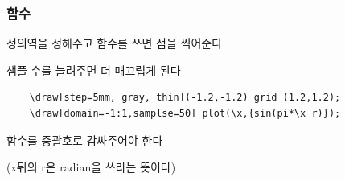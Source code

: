 \documentclass[12pt]{beamer}
\begin{document}
\subsubsection{함수}
\begin{frame}[fragile]{\secname}{\subsecname}
	정의역을 정해주고 함수를 쓰면 점을 찍어준다
	
	샘플 수를 늘려주면 더 매끄럽게 된다
	\begin{lstlisting}
	\draw[step=5mm, gray, thin](-1.2,-1.2) grid (1.2,1.2);
	\draw[domain=-1:1,samplse=50] plot(\x,{sin(pi*\x r)});
	\end{lstlisting}
	
	\vfill
	함수를 중괄호로 감싸주어야 한다
	
	(x뒤의 r은 radian을 쓰라는 뜻이다)
\end{frame}
\end{document}
